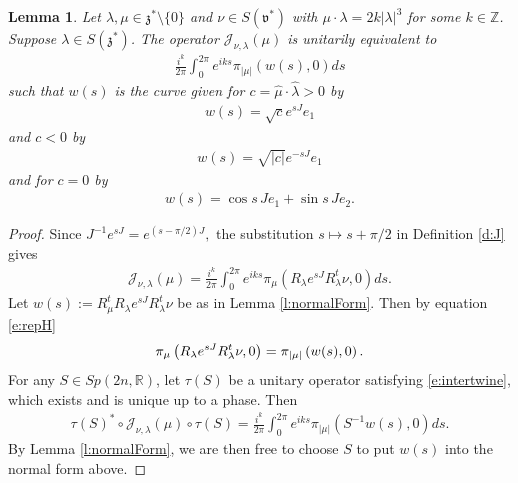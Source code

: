 \documentclass[11pt]{amsart}
\theoremstyle{plain}
\newtheorem{lemma}[theorem]{Lemma}
\theoremstyle{definition}
\theoremstyle{remark}
\numberwithin{equation}{section}
\def\fz{\mathfrak{z}}
\def\fv{\mathfrak{v}}
\def\cJ{\mathcal{J}}
\def\R{{\mathbb R}}%
\numberwithin{equation}{section}
\begin{document}
\begin{lemma}\label{l:Jconjugate} Let $\lambda, \mu\in \fz^*\setminus\{0\}$ and $\nu\in S(\fv^*)$ with $\mu\cdot\lambda =2k|\lambda|^3$ for some $k\in \mathbb{Z}$.
    Suppose $\lambda\in S(\fz^*)$. The operator $\cJ_{\nu, \lambda}(\mu)$ is unitarily equivalent to 
    \begin{align*}
        \frac{i^k}{2\pi}\int_0^{2\pi}e^{iks}\pi_{|\mu|}(w(s), 0)ds
    \end{align*}
    such that $w(s)$ is the curve given for $c=\hat\mu\cdot\hat\lambda>0$ by
    \begin{align*}
        w(s)=\sqrt{c}e^{sJ}e_1
    \end{align*}
    and $c<0$ by
    \begin{align*}
        w(s)=\sqrt{|c|}e^{-sJ}e_1
    \end{align*}
    and for $c=0$ by
    \begin{align*}
        w(s)=\cos s\, Je_1+\sin s\, Je_2.
    \end{align*}
\end{lemma}
\begin{proof}
Since $J^{-1}e^{sJ}=e^{(s-\pi/2)J},$ the substitution $s\mapsto s+\pi/2$ in Definition \ref{d:J} gives
\begin{align*}
    \cJ_{\nu, \lambda}(\mu)=\frac{i^k}{2\pi}\int_0^{2\pi}e^{iks}\pi_{\mu}\left(R_\lambda e^{sJ}R_\lambda^t\nu, 0\right)ds.
\end{align*}
Let $w(s):=R_\mu^tR_\lambda e^{sJ}R_\lambda^t\nu$ be as in Lemma \ref{l:normalForm}. Then by equation \eqref{e:repH}
	\begin{align*}
	\pi_\mu\left(R_\lambda e^{sJ}R_\lambda^{{\rm{t}}}\nu, 0\right)
		=\pi_{|\mu|}\left(w(s), 0\right).
	\end{align*}
    For any $S\in Sp(2n, \R)$, let $\tau(S)$ be a unitary operator satisfying \eqref{e:intertwine}, which exists and is unique up to a phase. Then
     \begin{align*}
        \tau(S)^*\circ \cJ_{\nu, \lambda}(\mu)\circ\tau(S)=\frac{i^k}{2\pi}\int_0^{2\pi}e^{iks}\pi_{|\mu|}(S^{-1}w(s), 0)ds.
    \end{align*}
    By Lemma \ref{l:normalForm}, we are then free to choose $S$ to put $w(s)$ into the normal form above.
\end{proof}
\end{document}
